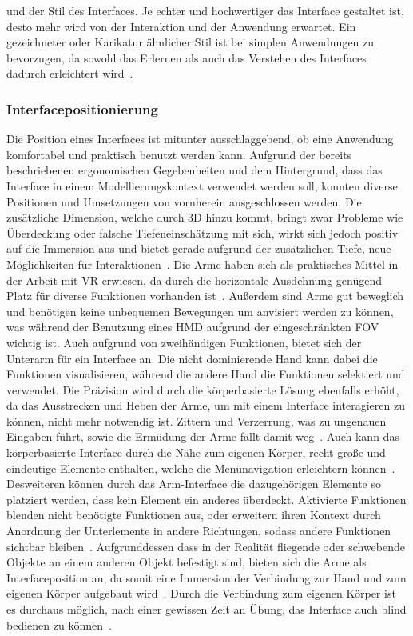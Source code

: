 und der Stil des Interfaces. Je echter und hochwertiger das Interface gestaltet ist, desto mehr wird von der Interaktion und der Anwendung erwartet. Ein gezeichneter oder Karikatur ähnlicher Stil ist bei simplen Anwendungen zu bevorzugen, da sowohl das Erlernen als auch das Verstehen des Interfaces dadurch erleichtert wird~\cite{theoryandpracticebook}.

\subsubsection{Interfacepositionierung}
Die Position eines Interfaces ist mitunter ausschlaggebend, ob eine Anwendung komfortabel und praktisch benutzt werden kann. Aufgrund der be\-reits beschriebenen ergonomischen Gegebenheiten und dem Hintergrund, dass das Interface in einem Modellierungskontext verwendet werden soll, konn\-ten diverse Positionen und Umsetzungen von vornherein ausgeschlossen werden. Die zusätzliche Dimension, welche durch 3D hinzu kommt, bringt zwar Probleme wie Überdeckung oder falsche Tiefeneinschätzung mit sich, wirkt sich jedoch positiv auf die Immersion aus und bietet gerade aufgrund der zusätzlichen Tiefe, neue Möglichkeiten für Interaktionen~\cite{constraints3duis}. Die Arme haben sich als praktisches Mittel in der Arbeit mit VR erwiesen, da durch die horizontale Ausdehnung genügend Platz für diverse Funktionen vorhanden ist~\cite{skinput}. Außerdem sind Arme gut beweglich und benötigen keine unbequemen Bewegungen um anvisiert werden zu können, was während der Benutzung eines HMD aufgrund der eingeschränkten FOV wichtig ist. Auch aufgrund von zweihändigen Funktionen, bietet sich der Unterarm für ein Interface an. Die nicht dominierende Hand kann dabei die Funktionen visualisieren, während die andere Hand die Funktionen selektiert und verwendet. Die Präzision wird durch die körperbasierte Lösung ebenfalls erhöht, da das Ausstrecken und Heben der Arme, um mit einem Interface interagieren zu können, nicht mehr notwendig ist. Zittern und Verzerrung, was zu ungenauen Eingaben führt, sowie die Ermüdung der Arme fällt damit weg~\cite{theoryandpracticebook,anintroductionto3dspacial,consumedindurance}. Auch kann das körperbasierte Interface durch die Nähe zum eigenen Körper, recht große und eindeutige Elemente enthalten, welche die Menünavigation erleichtern können~\cite{constraints3duis}. Desweiteren können durch das Arm-Interface die dazugehörigen Elemente so platziert werden, dass kein Element ein anderes überdeckt. Aktivierte Funktionen blenden nicht benötigte Funktionen aus, oder erweitern ihren Kontext durch Anordnung der Unterlemente in andere Richtungen, sodass andere Funktionen sichtbar bleiben~\cite{implicationsoflocation}.
Aufgrunddessen dass in der Rea\-lität fliegende oder schwebende Objekte an einem anderen Objekt befestigt sind, bieten sich die Arme als Interfaceposition an, da somit eine Immersion der Verbindung zur Hand und zum eigenen Körper aufgebaut wird~\cite{constraints3duis}.
Durch die Verbindung zum eigenen Körper ist es durchaus möglich, nach einer gewissen Zeit an Übung, das Interface auch blind bedienen zu können~\cite{theoryandpracticebook}.

